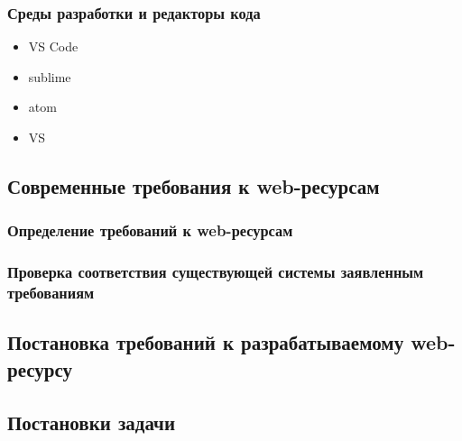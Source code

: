     \subsubsection{Среды разработки и редакторы кода}
        \begin{itemize}
            \item VS Code
            \item sublime
            \item atom
            \item VS
        \end{itemize}

\subsection{Современные требования к web-ресурсам}
    \subsubsection{Определение требований к web-ресурсам}
    
    \subsubsection{Проверка соответствия существующей системы заявленным требованиям}

\subsection{Постановка требований к разрабатываемому web-ресурсу}

\subsection{Постановки задачи}

\clearpage
